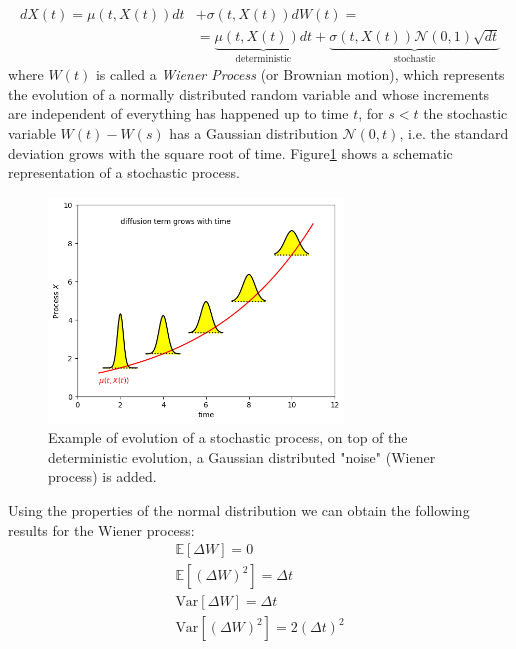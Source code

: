 \documentclass[12pt,a4paper]{book}
\begin{document}
\begin{equation}
\begin{aligned}
	dX(t) = \mu(t,X(t)) dt &+ \sigma(t,X(t)) dW(t) =\\  & =\underbrace{\mu(t,X(t))dt}_{\textrm{deterministic}} + \underbrace{\sigma(t,X(t)) \mathcal{N}(0,1)\sqrt{dt}}_{\textrm{stochastic}}
\end{aligned}
\label{eq:generic_sde}
\end{equation}
where $W(t)$ is called a \emph{Wiener Process} (or Brownian motion), which represents the evolution of a normally distributed random variable and whose increments are independent of everything has happened up to time $t$, for $s< t$ the stochastic variable $W(t)-W(s)$ has a Gaussian distribution $\mathcal{N}(0, t)$, i.e. the standard deviation grows with the square root of time.
Figure\ref{fig:stochastic_process_rappr} shows a schematic representation of a stochastic process.
\begin{figure}[htpb]
\begin{center}
	\includegraphics[height=6cm]{brownian_process}
\end{center}
\caption{Example of evolution of a stochastic process, on top of the deterministic evolution, a Gaussian distributed "noise" (Wiener process) is added.}
\label{fig:stochastic_process_rappr}
\end{figure}

Using the properties of the normal distribution we can obtain the following results for the Wiener process:
\begin{equation*}
\begin{gathered}
\mathbb{E}[\Delta W] = 0 \\
\mathbb{E}[(\Delta W)^2] = \Delta t \\
\text{Var}[\Delta W] = \Delta t \\
\text{Var}[(\Delta W)^2] = 2(\Delta t)^2 \\
\end{gathered}
\end{equation*}
\end{document}
